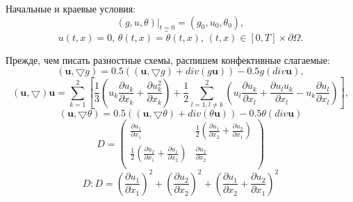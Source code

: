 \documentclass[a4paper]{article}
\theoremstyle{definition}
\numberwithin{equation}{section}
\begin{document}
Начальные и краевые условия:
$$(g,u,\theta)|_{t=0} = (g_0,u_0,\theta_0),$$
$$u(t,x)=0, \, \theta(t,x)=\tilde{\theta}(t,x), \, (t,x)\in[0,T]\times\partial\Omega.$$

Прежде, чем писать разностные схемы, распишем конфективные слагаемые:
$$(\textbf{u}, \bigtriangledown g) = 0.5((\textbf{u},\bigtriangledown g) + div(g\textbf{u})) - 0.5g (div\textbf{u}),$$
$$(\textbf{u},\bigtriangledown)\textbf{u} = \sum\limits_{k=1}^2 \left[\frac{1}{3}(u_k\frac{\partial u_k}{\partial x_k} + \frac{\partial u_k^2}{\partial x_k}) + \frac{1}{2} \sum\limits_{l=1,l\neq k}^2 (u_l\frac{\partial u_k}{\partial x_l} + \frac{\partial u_l u_k}{\partial x_l} - u_k\frac{\partial u_l}{\partial x_l})\right],$$
$$(\textbf{u},\bigtriangledown \theta) = 0.5((\textbf{u},\bigtriangledown \theta) + div(\theta\textbf{u})) - 0.5\theta(div\textbf{u}) $$
\[D=\left( \begin{matrix}
\frac{\partial u_1}{\partial x_1} & \frac{1}{2}\left( \frac{\partial u_1}{\partial x_2} + \frac{\partial u_2}{\partial x_1}\right) \\
\frac{1}{2}\left( \frac{\partial u_2}{\partial x_1} + \frac{\partial u_1}{\partial x_2}\right) & \frac{\partial u_2}{\partial x_2}\\
\end{matrix}\right) \]
$$D:D = (\frac{\partial u_1}{\partial x_1})^2 + (\frac{\partial u_2}{\partial x_2})^2 + (\frac{\partial u_1}{\partial x_2} + \frac{\partial u_2}{\partial x_1})^2$$
\newpage
\end{document}
